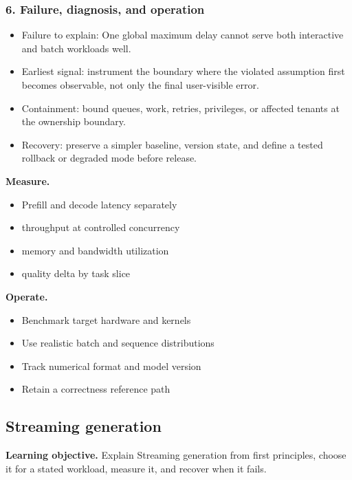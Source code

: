 \subsubsection*{6. Failure, diagnosis, and operation}
\begin{itemize}
\item Failure to explain: One global maximum delay cannot serve both interactive and batch workloads well.
\item Earliest signal: instrument the boundary where the violated assumption first becomes observable, not only the final user-visible error.
\item Containment: bound queues, work, retries, privileges, or affected tenants at the ownership boundary.
\item Recovery: preserve a simpler baseline, version state, and define a tested rollback or degraded mode before release.
\end{itemize}
\textbf{Measure.}\begin{itemize}
\item Prefill and decode latency separately
\item throughput at controlled concurrency
\item memory and bandwidth utilization
\item quality delta by task slice
\end{itemize}
\textbf{Operate.}\begin{itemize}
\item Benchmark target hardware and kernels
\item Use realistic batch and sequence distributions
\item Track numerical format and model version
\item Retain a correctness reference path
\end{itemize}
\subsection{Streaming generation}
\textbf{Learning objective.} Explain Streaming generation from first principles, choose it for a stated workload, measure it, and recover when it fails.
